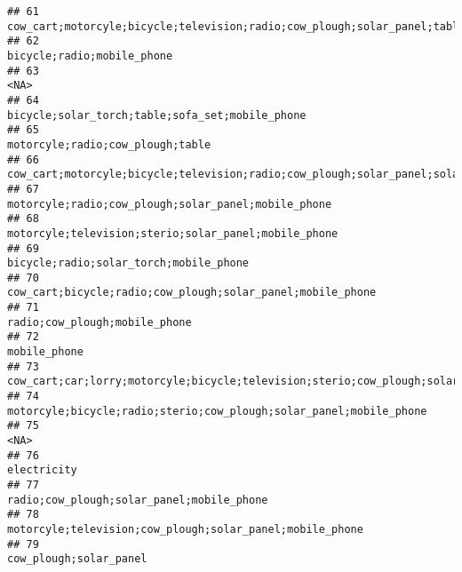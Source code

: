 \documentclass[
]{article}
\begin{document}
\begin{verbatim}
## 61                                                     cow_cart;motorcyle;bicycle;television;radio;cow_plough;solar_panel;table;mobile_phone
## 62                                                                                                                bicycle;radio;mobile_phone
## 63                                                                                                                                      <NA>
## 64                                                                                           bicycle;solar_torch;table;sofa_set;mobile_phone
## 65                                                                                                          motorcyle;radio;cow_plough;table
## 66                                               cow_cart;motorcyle;bicycle;television;radio;cow_plough;solar_panel;solar_torch;mobile_phone
## 67                                                                                       motorcyle;radio;cow_plough;solar_panel;mobile_phone
## 68                                                                                      motorcyle;television;sterio;solar_panel;mobile_phone
## 69                                                                                                    bicycle;radio;solar_torch;mobile_phone
## 70                                                                                cow_cart;bicycle;radio;cow_plough;solar_panel;mobile_phone
## 71                                                                                                             radio;cow_plough;mobile_phone
## 72                                                                                                                              mobile_phone
## 73  cow_cart;car;lorry;motorcyle;bicycle;television;sterio;cow_plough;solar_panel;solar_torch;electricity;table;sofa_set;mobile_phone;fridge
## 74                                                                        motorcyle;bicycle;radio;sterio;cow_plough;solar_panel;mobile_phone
## 75                                                                                                                                      <NA>
## 76                                                                                                                               electricity
## 77                                                                                                 radio;cow_plough;solar_panel;mobile_phone
## 78                                                                                  motorcyle;television;cow_plough;solar_panel;mobile_phone
## 79                                                                                                                    cow_plough;solar_panel

\end{verbatim}
\end{document}
